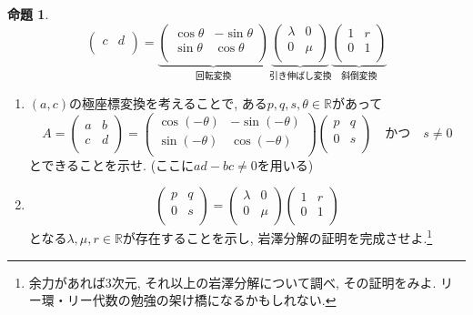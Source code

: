 \documentclass[dvipdfmx,a4paper,11pt]{article} %
\newcommand{\R}{\mathbb{R}}
\theoremstyle{definition}
\newtheorem{prop}[thm]{命題}
\begin{document}
\begin{enumerate}[label=\textbf{問題}\arabic*.]
\begin{prop}
$$\begin{pmatrix}
c & d \\
\end{pmatrix}
=
\underbrace{
\begin{pmatrix}
\cos \theta &  - \sin \theta \\
\sin \theta &  \cos \theta \\
\end{pmatrix}
}_{\text{回転変換}} 
\underbrace{
\begin{pmatrix}
\lambda & 0\\
0 & \mu \\
\end{pmatrix}
}_{\text{引き伸ばし変換}} 
\underbrace{
\begin{pmatrix}
1 & r\\
0& 1 \\
\end{pmatrix}
}_{\text{斜倒変換}}
$$

\end{prop}
\begin{enumerate}
\item $(a, c)$の極座標変換を考えることで, ある$p, q, s, \theta \in \R$があって
$$
A=\begin{pmatrix}
a & b\\
c & d \\
\end{pmatrix}
=
\begin{pmatrix}
\cos (-\theta) & - \sin (-\theta) \\
\sin (-\theta) &  \cos (-\theta) \\
\end{pmatrix}
\begin{pmatrix}
p & q\\
0 & s \\
\end{pmatrix}
\quad \text{かつ} \quad
s \neq 0
$$
とできることを示せ. (ここに$ad-bc \neq0$を用いる)
\item 
$$
\begin{pmatrix}
p & q\\
0 & s \\
\end{pmatrix}
=
\begin{pmatrix}
\lambda & 0\\
0 & \mu \\
\end{pmatrix}
\begin{pmatrix}
1 & r\\
0& 1 \\
\end{pmatrix}
$$
となる$\lambda, \mu, r \in \R$が存在することを示し, 岩澤分解の証明を完成させよ.\footnote{余力があれば3次元, それ以上の岩澤分解について調べ, その証明をみよ. リー環・リー代数の勉強の架け橋になるかもしれない.}
\end{enumerate}

\end{enumerate}
\newpage
\end{document}
